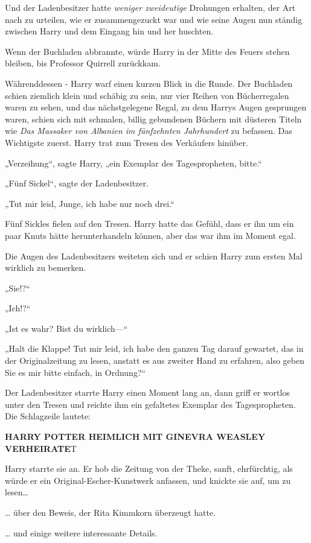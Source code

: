 {Und der Ladenbesitzer hatte \emph{weniger zweideutige} Drohungen erhalten, der Art nach zu urteilen, wie er zusammengezuckt war und wie seine Augen nun ständig zwischen Harry und dem Eingang hin und her huschten.

Wenn der Buchladen abbrannte, würde Harry in der Mitte des Feuers stehen bleiben, bis Professor Quirrell zurückkam.

Währenddessen - Harry warf einen kurzen Blick in die Runde. Der Buchladen schien ziemlich klein und schäbig zu sein, nur vier Reihen von Bücherregalen waren zu sehen, und das nächstgelegene Regal, zu dem Harrys Augen gesprungen waren, schien sich mit schmalen, billig gebundenen Büchern mit düsteren Titeln wie \emph{Das Massaker von Albanien im fünfzehnten Jahrhundert} zu befassen. Das Wichtigste zuerst. Harry trat zum Tresen des Verkäufers hinüber.

„Verzeihung“, sagte Harry, „ein Exemplar des Tagespropheten, bitte.“

„Fünf Sickel“, sagte der Ladenbesitzer.

„Tut mir leid, Junge, ich habe nur noch drei.“

Fünf Sickles fielen auf den Tresen. Harry hatte das Gefühl, dass er ihn um ein paar Knuts hätte herunterhandeln können, aber das war ihm im Moment egal.

Die Augen des Ladenbesitzers weiteten sich und er schien Harry zum ersten Mal wirklich zu bemerken.

„Sie!?“

„Ich!?“

„Ist es wahr? Bist du wirklich—“

„Halt die Klappe! Tut mir leid, ich habe den ganzen Tag darauf gewartet, das in der Originalzeitung zu lesen, anstatt es aus zweiter Hand zu erfahren, also geben Sie es mir bitte einfach, in Ordnung?“

Der Ladenbesitzer starrte Harry einen Moment lang an, dann griff er wortlos unter den Tresen und reichte ihm ein gefaltetes Exemplar des Tagespropheten. Die Schlagzeile lautete:

\textbf{HARRY POTTER HEIMLICH MIT GINEVRA WEASLEY VERHEIRATE}T

Harry starrte sie an. Er hob die Zeitung von der Theke, sanft, ehrfürchtig, als würde er ein Original-Escher-Kunstwerk anfassen, und knickte sie auf, um zu lesen…

… über den Beweis, der Rita Kimmkorn überzeugt hatte.

… und einige weitere interessante Details.

}
